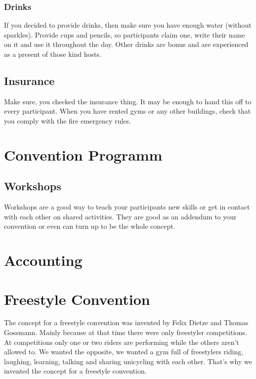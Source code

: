 \documentclass[11pt]{report}
\begin{document}
\subsection{Drinks}
If you decided to provide drinks, then make sure you have enough water 
(without sparkles). Provide cups and pencils, so participants claim one, write 
their name on it and use it throughout the day. Other drinks are bonus and are 
experienced as a present of those kind hosts.

\section{Insurance}

Make sure, you checked the insurance thing. It may be enough to hand this off to 
every participant. When you have rented gyms or any other buildings, check that 
you comply with the fire emergency rules. 

\chapter{Convention Programm}

\section{Workshops}
Workshops are a good way to teach your participants new skills or get in contact 
with each other on shared activities. They are good as an addendum to your 
convention or even can turn up to be the whole concept.

\chapter{Accounting}
\label{sec:Accounting}

\chapter{Freestyle Convention}

The concept for a freestyle convention was invented by Felix Dietze and Thomas 
Gossmann. Mainly because at that time there were only freestyler competitions.
At competitions only one or two riders are performing while the others aren't 
allowed to. We wanted the opposite, we wanted a gym full of freestylers riding, 
laughing, learning, talking and sharing unicycling with each other. That's why 
we invented the concept for a freestyle convention.
\end{document}
